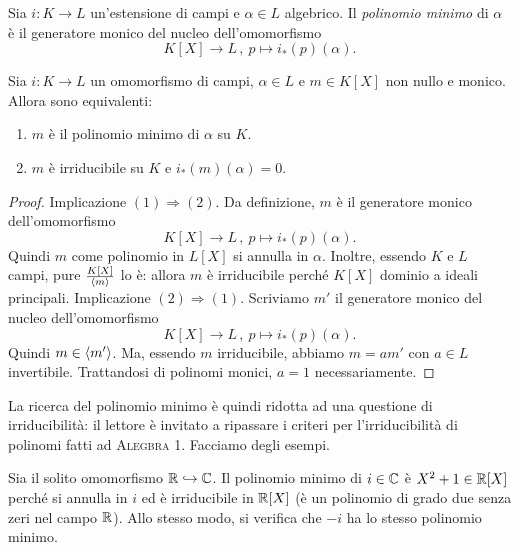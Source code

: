 \begin{defi}
Sia $i : K \to L$ un'estensione di campi e $\alpha \in L$ algebrico. Il {\em polinomio minimo} di $\alpha$ è il generatore monico del nucleo dell'omomorfismo
\[K[X] \to L\,,\ p \mapsto i_\ast(p)(\alpha) .\]
\end{defi}

\begin{prop}\label{prop:EquivalentiPolinomioMinimo}
Sia $i : K \to L$ un omomorfismo di campi, $\alpha \in L$ e $m \in K[X]$ non nullo e monico. Allora sono equivalenti:
\begin{enumerate}
\item $m$ è il polinomio minimo di $\alpha$ su $K$.
\item $m$ è irriducibile su $K$ e $i_\ast (m)(\alpha) = 0$.
\end{enumerate}
\end{prop}

\begin{proof}
Implicazione $(1) \Rightarrow (2)$. Da definizione, $m$ è il generatore monico dell'omomorfismo
\[K[X] \to L\,,\ p \mapsto i_\ast (p)(\alpha) .\]
Quindi $m$ come polinomio in $L[X]$ si annulla in $\alpha$. Inoltre, essendo $K$ e $L$ campi, pure $\frac{K[X]}{\left\langle m\right\rangle}$ lo è: allora $m$ è irriducibile perché $K[X]$ dominio a ideali principali.\newline
Implicazione $(2) \Rightarrow (1)$. Scriviamo $m'$ il generatore monico del nucleo dell'omomorfismo
\[K[X] \to L\,,\ p \mapsto i_\ast (p) (\alpha) .\]
Quindi $m \in \left\langle m'\right\rangle$. Ma, essendo $m$ irriducibile, abbiamo $m = a m'$ con $a \in L$ invertibile. Trattandosi di polinomi monici, $a = 1$ necessariamente.
\end{proof}

La ricerca del polinomio minimo è quindi ridotta ad una questione di irriducibilità: il lettore è invitato a ripassare i criteri per l'irriducibilità di polinomi fatti ad {\scshape Alegbra 1}. Facciamo degli esempi.

\begin{esem}
Sia il solito omomorfismo $\mathbb{R} \hookrightarrow \mathbb{C}$. Il polinomio minimo di $i \in \mathbb{C}$ è $X^2+1 \in \mathbb{R}[X]$ perché si annulla in $i$ ed è irriducibile in $\mathbb{R}[X]$ (è un polinomio di grado due senza zeri nel campo $\mathbb{R}$). Allo stesso modo, si verifica che $-i$ ha lo stesso polinomio minimo.
\end{esem}

